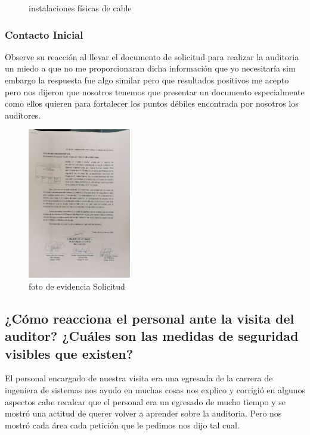 \documentclass[12pt,a4paper]{article}
\begin{document}
\begin{figure}[!htb]
    \centering
    \caption{instalaciones físicas de cable}
\end{figure}

\newpage
\subsubsection*{Contacto Inicial}
Observe su reacción al llevar el documento de solicitud para realizar la auditoria un miedo a que no me proporcionaran dicha información 
que yo necesitaría sim embargo la respuesta fue algo similar pero que resultados positivos me acepto pero nos dijeron que nosotros tenemos que presentar un documento 
especialmente como ellos quieren para fortalecer los puntos débiles encontrada por nosotros los auditores.
\begin{figure}[!htb]
    \centering
    \includegraphics[width=0.4\textwidth]{images/solicitud.jpeg}
    \caption{foto de evidencia Solicitud }

\end{figure}

\subsection*{¿Cómo reacciona el personal ante la visita del auditor? ¿Cuáles son las
medidas de seguridad visibles que existen?}
El personal encargado de nuestra visita era una egresada de la carrera de ingeniera de sistemas
nos ayudo en muchas cosas nos explico y corrigió en algunos aspectos cabe recalcar que el personal era
un egresado de mucho tiempo y se mostró una actitud de querer volver a aprender sobre la auditoria.
Pero nos mostró cada área cada petición que le pedimos nos dijo tal cual.
\end{document}
